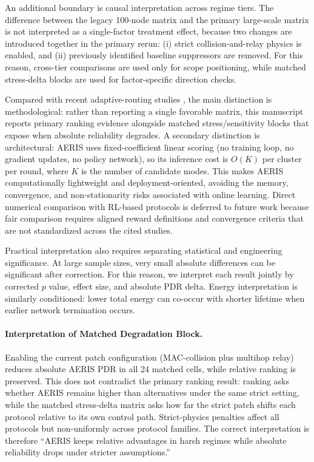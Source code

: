 ﻿\documentclass[sensors,article,submit,moreauthors,pdftex]{Definitions/mdpi}
\begin{document}
An additional boundary is causal interpretation across regime tiers. The difference between the legacy 100-node matrix and the primary large-scale matrix is not interpreted as a single-factor treatment effect, because two changes are introduced together in the primary rerun: (i) strict collision-and-relay physics is enabled, and (ii) previously identified baseline suppressors are removed. For this reason, cross-tier comparisons are used only for scope positioning, while matched stress-delta blocks are used for factor-specific direction checks.

Compared with recent adaptive-routing studies \cite{Ren2024,Okine2024,Naeem2024DRL,Scientific2025DRLGNN,Kaddi2024GWOCSMA,Wang2024Geographic,Tariq2024A,Jain2025Optimized,Ti2026HEOCP,Manogaran2025DDQN}, the main distinction is methodological: rather than reporting a single favorable matrix, this manuscript reports primary ranking evidence alongside matched stress/sensitivity blocks that expose when absolute reliability degrades. A secondary distinction is architectural: AERIS uses fixed-coefficient linear scoring (no training loop, no gradient updates, no policy network), so its inference cost is $O(K)$ per cluster per round, where $K$ is the number of candidate modes. This makes AERIS computationally lightweight and deployment-oriented, avoiding the memory, convergence, and non-stationarity risks associated with online learning. Direct numerical comparison with RL-based protocols is deferred to future work because fair comparison requires aligned reward definitions and convergence criteria that are not standardized across the cited studies.

Practical interpretation also requires separating statistical and engineering significance. At large sample sizes, very small absolute differences can be significant after correction. For this reason, we interpret each result jointly by corrected $p$ value, effect size, and absolute PDR delta. Energy interpretation is similarly conditioned: lower total energy can co-occur with shorter lifetime when earlier network termination occurs.

\paragraph{Interpretation of Matched Degradation Block.}
Enabling the current patch configuration (MAC-collision plus multihop relay) reduces absolute AERIS PDR in all 24 matched cells, while relative ranking is preserved. This does not contradict the primary ranking result: ranking asks whether AERIS remains higher than alternatives under the same strict setting, while the matched stress-delta matrix asks how far the strict patch shifts each protocol relative to its own control path. Strict-physics penalties affect all protocols but non-uniformly across protocol families. The correct interpretation is therefore ``AERIS keeps relative advantages in harsh regimes while absolute reliability drops under stricter assumptions.''
\end{document}
